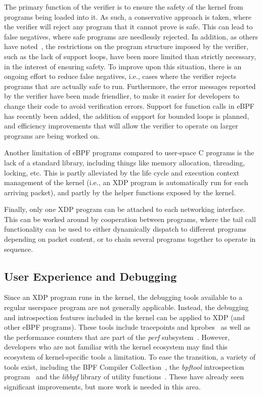 \documentclass[sigconf]{acmart}
\begin{document}
The primary function of the verifier is to ensure the safety of the kernel from
programs being loaded into it. As such, a conservative approach is taken, where
the verifier will reject any program that it cannot prove is safe. This can lead
to false negatives, where safe programs are needlessly rejected. In addition, as
others have noted~\cite{miano2018creating}, the restrictions on the program
structure imposed by the verifier, such as the lack of support loops, have been
more limited than strictly necessary, in the interest of ensuring safety. To
improve upon this situation, there is an ongoing effort to reduce false
negatives, i.e., cases where the verifier rejects programs that are actually
safe to run. Furthermore, the error messages reported by the verifier have been
made friendlier, to make it easier for developers to change their code to avoid
verification errors. Support for function calls in eBPF has recently been added,
the addition of support for bounded loops is planned, and efficiency
improvements that will allow the verifier to operate on larger programs are
being worked on.

Another limitation of eBPF programs compared to user-space C programs is the
lack of a standard library, including things like memory allocation, threading,
locking, etc. This is partly alleviated by the life cycle and execution context
management of the kernel (i.e., an XDP program is automatically run for each
arriving packet), and partly by the helper functions exposed by the kernel.

Finally, only one XDP program can be attached to each networking interface. This
can be worked around by cooperation between programs, where the tail call
functionality can be used to either dynamically dispatch to different programs
depending on packet content, or to chain several programs together to operate in
sequence.

\subsection{User Experience and Debugging}
\label{sec:user-exper-debugg}
Since an XDP program runs in the kernel, the debugging tools available to a
regular userspace program are not generally applicable. Instead, the debugging
and introspection features included in the kernel can be applied to XDP (and
other eBPF programs). These tools include tracepoints and
kprobes~\cite{kernel-tracing} as well as the performance counters that are part
of the \emph{perf} subsystem~\cite{perf}. However, developers who are not
familiar with the kernel ecosystem may find this ecosystem of kernel-specific
tools a limitation. To ease the transition, a variety of tools exist, including
the BPF Compiler Collection~\cite{bcc}, the \emph{bpftool} introspection
program~\cite{bpftool} and the \emph{libbpf} library of utility
functions~\cite{libbpf}. These have already seen significant improvements, but
more work is needed in this area.
\end{document}
